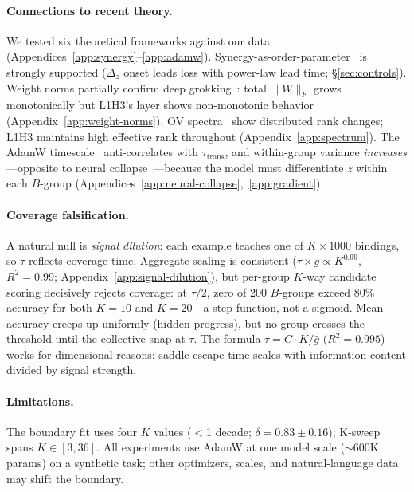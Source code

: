 \documentclass{article}
\begin{document}
\paragraph{Connections to recent theory.}
We tested six theoretical frameworks against our data (Appendices~\ref{app:synergy}--\ref{app:adamw}).
Synergy-as-order-parameter~\citep{aguilera2024synergy} is strongly supported ($\Delta_z$ onset leads loss with power-law lead time; \S\ref{sec:controls}).
Weight norms partially confirm deep grokking~\citep{gromov2024grokking}: total $\|W\|_F$ grows monotonically but L1H3's layer shows non-monotonic behavior (Appendix~\ref{app:weight-norms}).
OV spectra~\citep{tigges2024cdt} show distributed rank changes; L1H3 maintains high effective rank throughout (Appendix~\ref{app:spectrum}).
The AdamW timescale~\citep{lyu2025power} anti-correlates with $\tau_\text{trans}$, and within-group variance \emph{increases}---opposite to neural collapse~\citep{rangamani2025neural}---because the model must differentiate $z$ within each $B$-group (Appendices~\ref{app:neural-collapse},~\ref{app:gradient}).

\paragraph{Coverage falsification.}
A natural null is \emph{signal dilution}: each example teaches one of $K {\times} 1000$ bindings, so $\tau$ reflects coverage time.
Aggregate scaling is consistent ($\tau \times \bar{g} \propto K^{0.99}$, $R^2 {=} 0.99$; Appendix~\ref{app:signal-dilution}), but per-group $K$-way candidate scoring decisively rejects coverage: at $\tau/2$, zero of 200 $B$-groups exceed $80\%$ accuracy for both $K{=}10$ and $K{=}20$---a step function, not a sigmoid.
Mean accuracy creeps up uniformly (hidden progress), but no group crosses the threshold until the collective snap at $\tau$.
The formula $\tau {=} C {\cdot} K/\bar{g}$ ($R^2 {=} 0.995$) works for dimensional reasons: saddle escape time scales with information content divided by signal strength.

\paragraph{Limitations.}
The boundary fit uses four $K$ values ($<$1 decade; $\delta = 0.83 \pm 0.16$); K-sweep spans $K {\in} [3, 36]$.
All experiments use AdamW at one model scale (${\sim}600$K params) on a synthetic task; other optimizers, scales, and natural-language data may shift the boundary.
\end{document}
